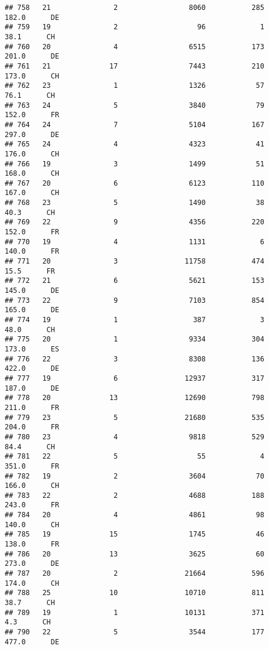 \documentclass[
]{article}
\begin{document}
\begin{verbatim}
## 758   21               2                 8060           285    182.0      DE
## 759   19               2                   96             1     38.1      CH
## 760   20               4                 6515           173    201.0      DE
## 761   21              17                 7443           210    173.0      CH
## 762   23               1                 1326            57     76.1      CH
## 763   24               5                 3840            79    152.0      FR
## 764   24               7                 5104           167    297.0      DE
## 765   24               4                 4323            41    176.0      CH
## 766   19               3                 1499            51    168.0      CH
## 767   20               6                 6123           110    167.0      CH
## 768   23               5                 1490            38     40.3      CH
## 769   22               9                 4356           220    152.0      FR
## 770   19               4                 1131             6    140.0      FR
## 771   20               3                11758           474     15.5      FR
## 772   21               6                 5621           153    145.0      DE
## 773   22               9                 7103           854    165.0      DE
## 774   19               1                  387             3     48.0      CH
## 775   20               1                 9334           304    173.0      ES
## 776   22               3                 8308           136    422.0      DE
## 777   19               6                12937           317    187.0      DE
## 778   20              13                12690           798    211.0      FR
## 779   23               5                21680           535    204.0      FR
## 780   23               4                 9818           529     84.4      CH
## 781   22               5                   55             4    351.0      FR
## 782   19               2                 3604            70    166.0      CH
## 783   22               2                 4688           188    243.0      FR
## 784   20               4                 4861            98    140.0      CH
## 785   19              15                 1745            46    138.0      FR
## 786   20              13                 3625            60    273.0      DE
## 787   20               2                21664           596    174.0      CH
## 788   25              10                10710           811     38.7      CH
## 789   19               1                10131           371      4.3      CH
## 790   22               5                 3544           177    477.0      DE

\end{verbatim}
\end{document}
